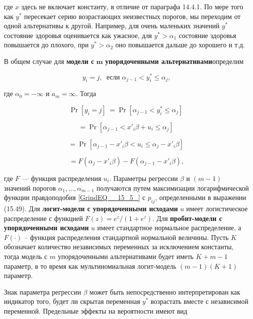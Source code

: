 где $x$ здесь не включает константу, в отличие от параграфа 14.4.1. По мере того как $y^*$ пересекает серию возрастающих неизвестных порогов, мы переходим от одной альтернативы к другой. Например, для очень маленьких значений $y^*$ состояние здоровья оценивается как ужасное, для $y^*>{\alpha }_1$ состояние здоровья повышается до плохого, при $y^*>{\alpha }_2$ оно повышается дальше до хорошего и т.д.

В общем случае для \textbf{модели с } ${\mathbf m}$ \textbf{ упорядоченными альтернативами}определим

\begin{equation} \label{GrindEQ__15_48_} y_i=j,\ \text{ если } {\alpha }_{j-1}<y^*_i\le {\alpha }_j, \end{equation} 

где ${\alpha }_0=-\infty $ и $a_m=\infty $. Тогда

\[{\Pr  \left[y_i=j\right]\ }={\Pr  \left[{\alpha }_{j-1}<y^*_i\le {\alpha }_j\right]\ }\] 

\[={\Pr  \left[{\alpha }_{j-1}<x'_i\beta +u_i\le {\alpha }_j\right]\ }\] 

\begin{equation} \label{GrindEQ__15_49_} ={\Pr  \left[{\alpha }_{j-1}-x'_i\beta <u_i\le {\alpha }_j-x'_i\beta \right]\ } \end{equation} 

\[=F\left({\alpha }_j-x'_i\beta \right)-F\left({\alpha }_{j-1}-x'_i\beta \right),\] 

где $F$ --- функция распределения $u_i$. Параметры регрессии $\beta $ и $(m-1)$ значений порогов ${\alpha }_1,\dots ,{\alpha }_{m-1}$ получаются путем максимизации логарифмической функции правдоподобия \eqref{GrindEQ__15_5_} с $p_{ij}$, определенными в выражении (15.49). Для \textbf{логит-модели с упорядоченными исходами} $u$ имеет логистическое распределение с функцией $F\left(z\right)={e^z}/{(1+e^z)}$. Для \textbf{пробит-модели с упорядоченными исходами} $u$ имеет стандартное нормальное распределение, а $F(\cdot )$ -- функция распределения стандартной нормальной величины. Пусть $K$ обозначает количество независимых переменных за исключением константы, тогда модель с $m$ упорядоченными альтернативами будет иметь $K+m-1$ параметр, в то время как мультиномиальная логит-модель $(m-1)(K+1)$ параметр.

Знак параметра регрессии $\beta $ может быть непосредственно интерпретирован как индикатор того, будет ли скрытая переменная $y^*$ возрастать вместе с независимой переменной. Предельные эффекты на вероятности имеют вид

